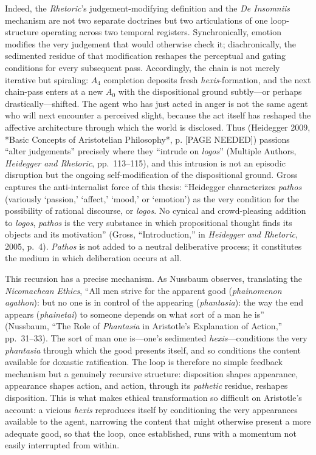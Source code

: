 \documentclass{article}
\begin{document}
Indeed, the \textit{Rhetoric}'s judgement-modifying definition and the \textit{De Insomniis} mechanism are not two separate doctrines but two articulations of one loop-structure operating across two temporal registers. Synchronically, emotion modifies the very judgement that would otherwise check it; diachronically, the sedimented residue of that modification reshapes the perceptual and gating conditions for every subsequent pass. Accordingly, the chain is not merely iterative but spiraling: $A_4$ completion deposits fresh \textit{hexis}-formation, and the next chain-pass enters at a new $A_0$ with the dispositional ground subtly---or perhaps drastically---shifted. The agent who has just acted in anger is not the same agent who will next encounter a perceived slight, because the act itself has reshaped the affective architecture through which the world is disclosed. Thus (Heidegger 2009, *Basic Concepts of Aristotelian Philosophy*, p. [PAGE NEEDED]) passions ``alter judgements'' precisely where they ``intrude on \textit{logos}'' (Multiple Authors, \textit{Heidegger and Rhetoric}, pp.~113--115), and this intrusion is not an episodic disruption but the ongoing self-modification of the dispositional ground. Gross captures the anti-internalist force of this thesis: ``Heidegger characterizes \textit{pathos} (variously `passion,' `affect,' `mood,' or `emotion') as the very condition for the possibility of rational discourse, or \textit{logos}. No cynical and crowd-pleasing addition to \textit{logos}, \textit{pathos} is the very substance in which propositional thought finds its objects and its motivation'' (Gross, ``Introduction,'' in \textit{Heidegger and Rhetoric}, 2005, p.~4). \textit{Pathos} is not added to a neutral deliberative process; it constitutes the medium in which deliberation occurs at all.

This recursion has a precise mechanism. As Nussbaum observes, translating the \textit{Nicomachean Ethics}, ``All men strive for the apparent good (\textit{phainomenon agathon}): but no one is in control of the appearing (\textit{phantasia}): the way the end appears (\textit{phainetai}) to someone depends on what sort of a man he is'' (Nussbaum, ``The Role of \textit{Phantasia} in Aristotle's Explanation of Action,'' pp.~31--33). The sort of man one is---one's sedimented \textit{hexis}---conditions the very \textit{phantasia} through which the good presents itself, and so conditions the content available for doxastic ratification. The loop is therefore no simple feedback mechanism but a genuinely recursive structure: disposition shapes appearance, appearance shapes action, and action, through its \textit{pathetic} residue, reshapes disposition. This is what makes ethical transformation so difficult on Aristotle's account: a vicious \textit{hexis} reproduces itself by conditioning the very appearances available to the agent, narrowing the content that might otherwise present a more adequate good, so that the loop, once established, runs with a momentum not easily interrupted from within.
\end{document}
